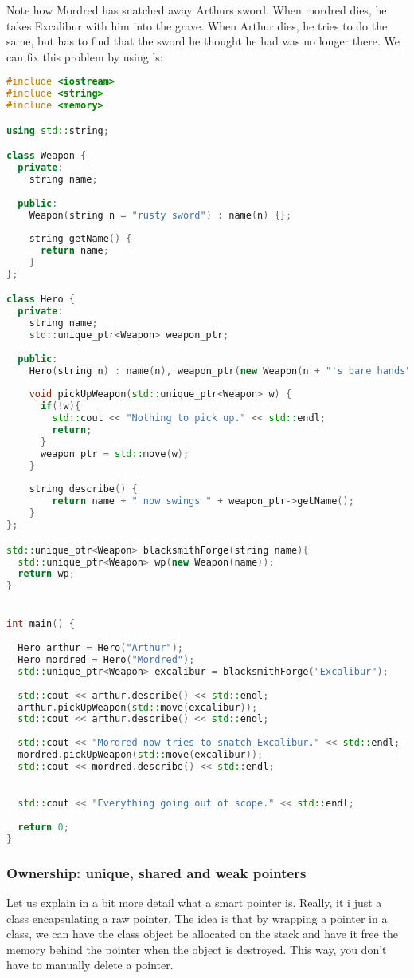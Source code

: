 Note how Mordred has snatched away Arthurs sword. When mordred dies, he takes Excalibur with him into the grave. When Arthur dies, he tries to do the same, but has to find that the sword he thought he had was no longer there. We can fix this problem by using 's:

\begin{lstlisting}[language=c++]
#include <iostream>
#include <string>
#include <memory>

using std::string;

class Weapon {
  private:
    string name;
  
  public:
    Weapon(string n = "rusty sword") : name(n) {};
    
    string getName() {
      return name;
    }
};

class Hero {
  private:
    string name;
    std::unique_ptr<Weapon> weapon_ptr;
  
  public:
    Hero(string n) : name(n), weapon_ptr(new Weapon(n + "'s bare hands")) {}
    
    void pickUpWeapon(std::unique_ptr<Weapon> w) {
      if(!w){
        std::cout << "Nothing to pick up." << std::endl;
        return;
      }
      weapon_ptr = std::move(w);
    }
    
    string describe() {
        return name + " now swings " + weapon_ptr->getName();
    }
};

std::unique_ptr<Weapon> blacksmithForge(string name){
  std::unique_ptr<Weapon> wp(new Weapon(name));
  return wp;
}


int main() {
  
  Hero arthur = Hero("Arthur");
  Hero mordred = Hero("Mordred");
  std::unique_ptr<Weapon> excalibur = blacksmithForge("Excalibur");
  
  std::cout << arthur.describe() << std::endl;
  arthur.pickUpWeapon(std::move(excalibur));
  std::cout << arthur.describe() << std::endl;
  
  std::cout << "Mordred now tries to snatch Excalibur." << std::endl;
  mordred.pickUpWeapon(std::move(excalibur));
  std::cout << mordred.describe() << std::endl;
  

  std::cout << "Everything going out of scope." << std::endl;
  
  return 0;
}
\end{lstlisting}




\subsubsection{Ownership: unique, shared and weak pointers}
Let us explain in a bit more detail what a smart pointer is. Really, it i just a class encapsulating a raw pointer. The idea is that by wrapping a pointer in a class, we can have the class object be allocated on the stack and have it free the memory behind the pointer when the object is destroyed. This way, you don't have to manually delete a pointer.

